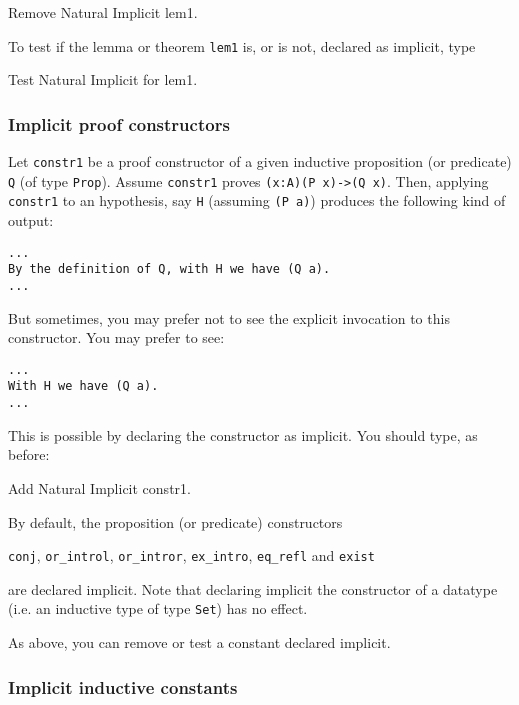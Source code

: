 \begin{coq_example*}
Remove Natural Implicit lem1.
\end{coq_example*}

To test if the lemma or theorem \verb=lem1= is, or is not,
declared as implicit, type

\begin{coq_example*}
Test Natural Implicit for lem1.
\end{coq_example*}

\subsubsection*{Implicit proof constructors}

Let \verb=constr1= be a proof constructor of a given inductive
proposition (or predicate)
\verb=Q= (of type \verb=Prop=). Assume \verb=constr1= proves 
\verb=(x:A)(P x)->(Q x)=. Then, applying \verb=constr1= to an hypothesis,
say \verb=H= (assuming \verb=(P a)=) produces the following kind of output:

\begin{verbatim}
...
By the definition of Q, with H we have (Q a).
...
\end{verbatim}

But sometimes, you may prefer not to see the explicit invocation to
this constructor. You may prefer to see:

\begin{verbatim}
...
With H we have (Q a).
...
\end{verbatim}

This is possible by declaring the constructor as implicit. You should
type, as before:

\begin{coq_example*}
Add Natural Implicit constr1.
\end{coq_example*}

By default, the proposition (or predicate) constructors

\verb=conj=, \verb=or_introl=, \verb=or_intror=, \verb=ex_intro=,
\verb=eq_refl= and \verb=exist=

\noindent are declared implicit. Note that declaring implicit the
constructor of a datatype (i.e. an inductive type of type \verb=Set=)
has no effect.

As above, you can remove or test a constant declared implicit.

\subsubsection*{Implicit inductive constants}

